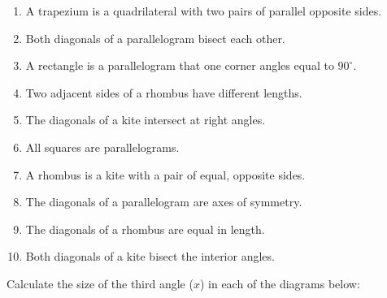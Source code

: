 \begin{enumerate}[noitemsep, label=\textbf{\arabic*}. ] 
\item  A trapezium is a quadrilateral with two pairs of parallel opposite sides.
\item  Both diagonals of a parallelogram bisect each other.
\item  A rectangle is a parallelogram that one corner angles equal to $90^{\circ}$.
\item  Two adjacent sides of a rhombus have different lengths.
\item  The diagonals of a kite intersect at right angles.
\item All squares are parallelograms.
\item A rhombus is a kite with a pair of equal, opposite sides.
\item The diagonals of a parallelogram are axes of symmetry.
\item The diagonals of a rhombus are equal in length.
\item Both diagonals of a kite bisect the interior angles.
\end{enumerate}
Calculate the size of the third angle ($x$) in each of the diagrams below:
